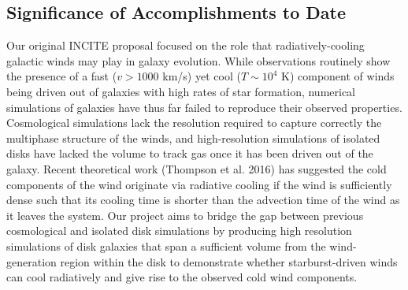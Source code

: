\documentclass[11pt,letterpaper,english]{article}
\begin{document}
\subsection{Significance of Accomplishments to Date} 


Our original INCITE proposal focused on the role that radiatively-cooling galactic winds may play in galaxy evolution. While observations routinely show the presence of a fast ($v > 1000$ km/s) yet cool ($T\sim10^4$ K) component of winds being driven out of galaxies with high rates of star formation, numerical simulations of galaxies have thus far failed to reproduce their observed properties. 
Cosmological simulations lack the resolution required to capture correctly the multiphase structure of the winds, and high-resolution simulations of isolated disks have lacked the volume to track gas once it has been driven out of the galaxy. Recent theoretical work (Thompson et al. 2016) has suggested the cold components of the wind originate via radiative cooling
if the wind is sufficiently dense such that its cooling time is shorter than the advection time of the
wind as it leaves the system.
Our project aims to bridge the gap between previous cosmological and isolated disk simulations by producing high resolution simulations of disk galaxies that span a sufficient volume from the wind-generation region within the disk to demonstrate whether starburst-driven winds can cool radiatively and give rise to the 
observed cold wind components.
\end{document}
